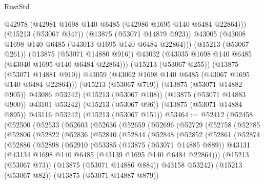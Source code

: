 \begin{lexlean}{RustStd}
\begin{coremodule}
                  @42978
                  (@42981 @1698 @140 @6485 (@42986 @1695 @140 @6484 @22864)))
                (@15213 (@53067 @347))
                (@13875 (@53071 @14879 @923))
                @43005
                (@43008 @1698 @140 @6485 (@43013 @1695 @140 @6484 @22864)))
              (@15213 (@53067 @261))
              (@13875 (@53071 @14880 @916))
              @43032
              (@43035 @1698 @140 @6485 (@43040 @1695 @140 @6484 @22864)))
            (@15213 (@53067 @255))
            (@13875 (@53071 @14881 @910))
            @43059
            (@43062 @1698 @140 @6485 (@43067 @1695 @140 @6484 @22864)))
          (@15213 (@53067 @719))
          (@13875 (@53071 @14882 @905))
          @43086
          @53242)
        (@15213 (@53067 @108))
        (@13875 (@53071 @14883 @900))
        @43101
        @53242)
      (@15213 (@53067 @96))
      (@13875 (@53071 @14884 @895))
      @43116
      @53242)
    (@15213 (@53067 @151))
@53464 := @52412
    (@52458
      (@52500
        (@52533
          (@52603
            (@52636
              (@52659
                (@52696
                  (@52729
                    (@52758
                      (@52785
                        (@52806
                          (@52822
                            (@52836
                              (@52840
                                (@52844
                                  (@52848
                                    (@52852
                                      (@52861
                                        (@52874
                                          (@52886
                                            (@52898
                                              (@52910
                                                (@53385
                                                  (@13875 (@53071 @14885 @889))
                                                  @43131
                                                  (@43134
                                                    @1698
                                                    @140
                                                    @6485
                                                    (@43139 @1695 @140 @6484 @22864)))
                                                (@15213 (@53067 @73))
                                                (@13875 (@53071 @14886 @884))
                                                @43158
                                                @53242)
                                              (@15213 (@53067 @82))
                                              (@13875 (@53071 @14887 @879))

\end{coremodule}
\end{lexlean}

